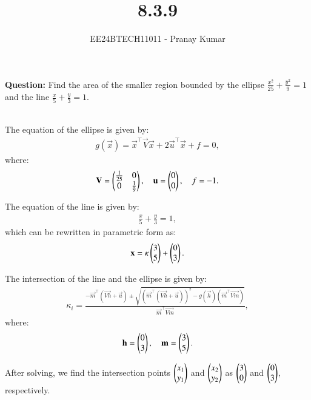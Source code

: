 \documentclass[journal]{IEEEtran}
\begin{document}

\vspace{3cm}

\title{8.3.9}
\author{EE24BTECH11011 - Pranay Kumar}
{\let\newpage\relax\maketitle}

\textbf{Question:}
Find the area of the smaller region bounded by the ellipse \(\frac{x^2}{25} + \frac{y^2}{9} = 1\) and the line \(\frac{x}{5} + \frac{y}{3} = 1\).

\solution\\

The equation of the ellipse is given by:
\begin{align}
g(\vec{x}) = \vec{x}^\top \vec{V} \vec{x} + 2\vec{u}^\top \vec{x} + f = 0,
\end{align}
where:
\begin{align}
\mathbf{V} = \begin{pmatrix}\frac{1}{25} & 0 \\
0 & \frac{1}{9}\end{pmatrix}, \quad \mathbf{u} = \begin{pmatrix}0 \\
0\end{pmatrix}, \quad f = -1.
\end{align}

The equation of the line is given by:
\begin{align}
\frac{x}{5} + \frac{y}{3} = 1,
\end{align}
which can be rewritten in parametric form as:
\begin{align}
\mathbf{x} = \kappa \begin{pmatrix}3 \\
5\end{pmatrix} + \begin{pmatrix}0 \\
3\end{pmatrix}.
\end{align}

The intersection of the line and the ellipse is given by:
\begin{align}
\kappa_i = \frac{-\vec{m}^\top (\vec{Vh} + \vec{u}) \pm \sqrt{\left(\vec{m}^\top (\vec{Vh} + \vec{u})\right)^2 - g(\vec{h})(\vec{m}^\top \vec{Vm})}}{\vec{m}^\top \vec{Vm}},
\end{align}
where:
\begin{align}
\mathbf{h} = \begin{pmatrix}0 \\
3\end{pmatrix}, \quad \mathbf{m} = \begin{pmatrix}3 \\
5\end{pmatrix}.
\end{align}

After solving, we find the intersection points \(\begin{pmatrix}x_1 \\
y_1\end{pmatrix}\) and \(\begin{pmatrix}x_2 \\
y_2\end{pmatrix}\) as \(\begin{pmatrix}3 \\
0\end{pmatrix}\) and \(\begin{pmatrix}0 \\
3\end{pmatrix}\), respectively.
\end{document}
